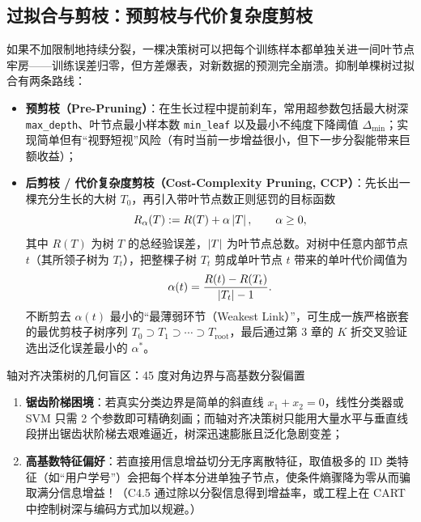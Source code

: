 \subsection{过拟合与剪枝：预剪枝与代价复杂度剪枝}

如果不加限制地持续分裂，一棵决策树可以把每个训练样本都单独关进一间叶节点牢房——训练误差归零，但方差爆表，对新数据的预测完全崩溃。抑制单棵树过拟合有两条路线：
\begin{itemize}
  \item \textbf{预剪枝（Pre-Pruning）}：在生长过程中提前刹车，常用超参数包括最大树深 \texttt{max\_depth}、叶节点最小样本数 \texttt{min\_leaf} 以及最小不纯度下降阈值 $\Delta_{\min}$；实现简单但有“视野短视”风险（有时当前一步增益很小，但下一步分裂能带来巨额收益）；
  \item \textbf{后剪枝 / 代价复杂度剪枝（Cost-Complexity Pruning, CCP）}：先长出一棵充分生长的大树 $T_0$，再引入带叶节点数正则惩罚的目标函数
  \begin{equation}\label{eq:cart-ccp}
    R_\alpha(T) := R(T) + \alpha \left|T\right|, \qquad \alpha \ge 0,
  \end{equation}
  其中 $R(T)$ 为树 $T$ 的总经验误差，$\left|T\right|$ 为叶节点总数。对树中任意内部节点 $t$（其所领子树为 $T_t$），把整棵子树 $T_t$ 剪成单叶节点 $t$ 带来的单叶代价阈值为
  \[
    \alpha(t) = \frac{R(t) - R(T_t)}{\left|T_t\right| - 1}.
  \]
  不断剪去 $\alpha(t)$ 最小的“最薄弱环节（Weakest Link）”，可生成一族严格嵌套的最优剪枝子树序列 $T_0 \supset T_1 \supset \cdots \supset T_{\text{root}}$，最后通过第 3 章的 $K$ 折交叉验证选出泛化误差最小的 $\alpha^*$。
\end{itemize}

\begin{failBox}{轴对齐决策树的几何盲区：45 度对角边界与高基数分裂偏置}
\begin{enumerate}
  \item \textbf{锯齿阶梯困境}：若真实分类边界是简单的斜直线 $x_1 + x_2 = 0$，线性分类器或 SVM 只需 2 个参数即可精确刻画；而轴对齐决策树只能用大量水平与垂直线段拼出锯齿状阶梯去艰难逼近，树深迅速膨胀且泛化急剧变差；
  \item \textbf{高基数特征偏好}：若直接用信息增益切分无序离散特征，取值极多的 ID 类特征（如“用户学号”）会把每个样本分进单独子节点，使条件熵骤降为零从而骗取满分信息增益！（C4.5 通过除以分裂信息得到增益率，或工程上在 CART 中控制树深与编码方式加以规避。）
\end{enumerate}
\end{failBox}


